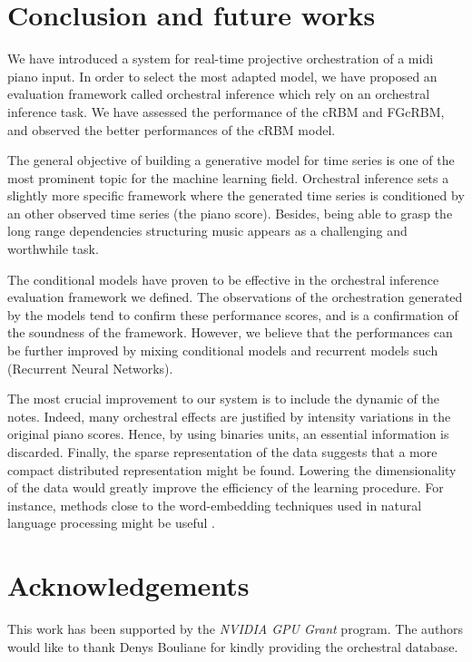 \documentclass{article}
\begin{document}
\section{Conclusion and future works}
We have introduced a system for real-time projective orchestration of a midi piano input. In order to select the most adapted model, we have proposed an evaluation framework called orchestral inference which rely on an orchestral inference task. We have assessed the performance of the cRBM and FGcRBM, and observed the better performances of the cRBM model.

The general objective of building a generative model for time series is one of the most prominent topic for the machine learning field. Orchestral inference sets a slightly more specific framework where the generated time series is conditioned by an other observed time series (the piano score). Besides, being able to grasp the long range dependencies structuring music appears as a challenging and worthwhile task.


The conditional models have proven to be effective in the orchestral inference evaluation framework we defined. The observations of the orchestration generated by the models tend to confirm these performance scores, and is a confirmation of the soundness of the framework.
However, we believe that the performances can be further improved by mixing conditional models and recurrent models such (Recurrent Neural Networks).

The most crucial improvement to our system is to include the dynamic of the notes.
Indeed, many orchestral effects are justified by intensity variations in the original piano scores. 
Hence, by using binaries units, an essential  information is discarded.
Finally, the sparse representation of the data suggests that a more compact distributed representation might be found. Lowering the dimensionality of the data would greatly improve the efficiency of the learning procedure. For instance, methods close to the word-embedding techniques used in natural language processing might be useful \cite{kiros2015skip}.

\section{Acknowledgements}
This work has been supported by the \textit{NVIDIA GPU Grant} program.
The authors would like to thank Denys Bouliane for kindly providing the orchestral database.


\end{document}
